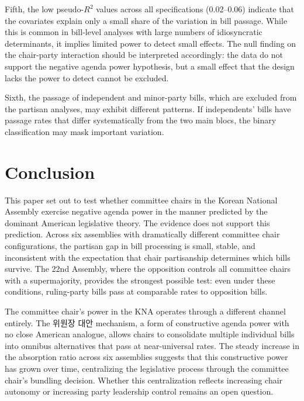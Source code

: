 \documentclass[11pt]{article}
\begin{document}
Fifth, the low pseudo-$R^2$ values across all specifications (0.02--0.06) indicate that the covariates explain only a small share of the variation in bill passage. While this is common in bill-level analyses with large numbers of idiosyncratic determinants, it implies limited power to detect small effects. The null finding on the chair-party interaction should be interpreted accordingly: the data do not support the negative agenda power hypothesis, but a small effect that the design lacks the power to detect cannot be excluded.

Sixth, the passage of independent and minor-party bills, which are excluded from the partisan analyses, may exhibit different patterns. If independents' bills have passage rates that differ systematically from the two main blocs, the binary classification may mask important variation.


\section{Conclusion}
\label{sec:conclusion}

This paper set out to test whether committee chairs in the Korean National Assembly exercise negative agenda power in the manner predicted by the dominant American legislative theory. The evidence does not support this prediction. Across six assemblies with dramatically different committee chair configurations, the partisan gap in bill processing is small, stable, and inconsistent with the expectation that chair partisanship determines which bills survive. The 22nd Assembly, where the opposition controls all committee chairs with a supermajority, provides the strongest possible test: even under these conditions, ruling-party bills pass at comparable rates to opposition bills.

The committee chair's power in the KNA operates through a different channel entirely. The 위원장 대안 mechanism, a form of constructive agenda power with no close American analogue, allows chairs to consolidate multiple individual bills into omnibus alternatives that pass at near-universal rates. The steady increase in the absorption ratio across six assemblies suggests that this constructive power has grown over time, centralizing the legislative process through the committee chair's bundling decision. Whether this centralization reflects increasing chair autonomy or increasing party leadership control remains an open question.
\end{document}
